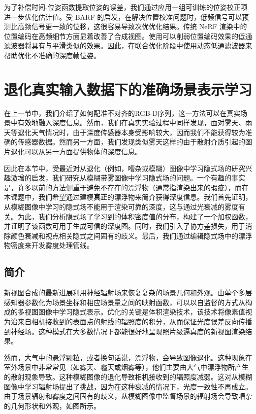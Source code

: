 为了补偿时间-位姿函数提取位姿的误差，我们通过应用一组可训练的位姿校正项进一步优化估计值。受 BARF\cite{lin_barf_2021} 的启发，在解决位置校准问题时，低频信号可以预测比高频信号更一致的位移，这很容易导致次优优化结果。传统 NeRF 渲染中的位置编码在高频细节方面显着改善了合成视图。使用可以削弱位置编码效果的低通滤波器将具有与平滑类似的效果。因此，在联合优化阶段中使用动态低通滤波器来帮助优化不准确的深度帧位姿。

\newpage
\section{退化真实输入数据下的准确场景表示学习}
在上一节中，我们介绍了如何配准不对齐的RGB-D序列，这一方法可以在真实场景中有效地融入深度信息。然而，我们在真实实验过程中同样发现，面对雾天、雨天等退化天气情况时，由于深度传感器本身受影响较大，因而我们不能获得较为准确的传感器数据。然而另一方面，我们发现类似雾天这样的由于散射介质引起的图片退化可以从另一方面提供物体的深度信息。

因此在本节中，受最近对从退化（例如，嘈杂或模糊）图像中学习隐式场的研究兴趣激增的启发，我们研究从模糊带雾图像中学习隐式场的问题。一个有趣的事实是，许多以前的方法侧重于避免不存在的漂浮物（通常指渲染出来的瑕疵），而在本课题中，我们希望通过建模\textbf{真正}的漂浮物来简介获得深度信息。我们首先证明，从模糊图像中学习的隐式场不能用于渲染可靠的深度，这与通过光衰减的雾度有关。为此，我们分析隐式场了学习到的体积密度值的分布，构建了一个加权函数，并证明了该函数可用于生成可信的深度图。同时，我们引入了协方差损失，用于消除颜色衰减和视点相关隐式之间固有的歧义。最后，我们通过编辑隐式场中的漂浮物密度来开发雾度处理管线。

\subsection{简介}
新视图合成的最新进展利用神经辐射场来恢复复杂的场景几何和外观。由单个多层感知器参数化为场景坐标和相应场景量之间的映射函数，可以以自监督的方式从构成的多视图图像中学习隐式表示。优化的关键是体积渲染技术，该技术将像素值视为沿来自相机接收到的表面点的射线的辐照度的积分，从而保证光度误差反向传播到神经场。这种模式在大多数情况下都能很好地呈现照片级逼真度的新视图渲染结果。

然而，大气中的悬浮颗粒，或者换句话说，漂浮物，会导致图像退化。这种现象在室外场景中非常常见（如雾天、霾天或烟雾等），他们主要由大气中漂浮物所产生的散射现象导致。这种模糊图像的退化导致相机接收到的辐照度减弱。这对从模糊图像中学习辐射场提出了挑战，因为在这种衰减的情况下，光度一致性不再成立。由于场景辐射和雾度之间固有的歧义，从模糊图像中监督场景的辐射场会导致嘈杂的几何形状和外观，如图所示。

